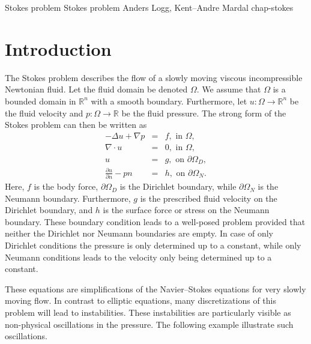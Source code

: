               {Stokes problem}
              {Stokes problem} 
              {Anders Logg, Kent--Andre Mardal} 
              {chap-stokes}   
\label{chap-stokes}



\section{Introduction}
The Stokes problem describes the flow of a slowly moving viscous incompressible Newtonian
fluid.  Let the fluid domain be denoted $\Omega$. We assume that $\Omega$ is a bounded domain in $\mathbb{R}^n$ with a smooth boundary. Furthermore, let $u : \Omega \rightarrow \mathbb{R}^n$ be
the fluid velocity and $p:\Omega \rightarrow \mathbb{R}$ be the fluid pressure.
The strong form of the Stokes problem can then be written as
\begin{eqnarray}
-\Delta u + \nabla p &=& f, \mbox{ in } \Omega,   \\
\nabla \cdot u &=& 0, \mbox{ in } \Omega, \\
u &=& g, \mbox{ on } \partial \Omega_D, \\
\frac{\partial u}{\partial n} - p n  &=& h, \mbox{ on } \partial \Omega_N.
\end{eqnarray}
Here, $f$ is the body force, $\partial \Omega_D$ is the Dirichlet
boundary, while $\partial \Omega_N$ is the Neumann
boundary. Furthermore, $g$ is the prescribed fluid velocity on the
Dirichlet boundary, and $h$ is the surface force or stress on the
Neumann boundary. These boundary condition leads to a well-posed
problem provided that neither the Dirichlet nor Neumann boundaries are
empty.  In case of only Dirichlet conditions the pressure is only
determined up to a constant, while only Neumann conditions leads to
the velocity only being determined up to a constant.

These equations are simplifications of the Navier--Stokes equations for
very slowly moving flow.  In contrast to elliptic equations, many
discretizations of this problem will lead to instabilities.  These
instabilities are particularly visible as non-physical oscillations in
the pressure. The following example illustrate such oscillations.

